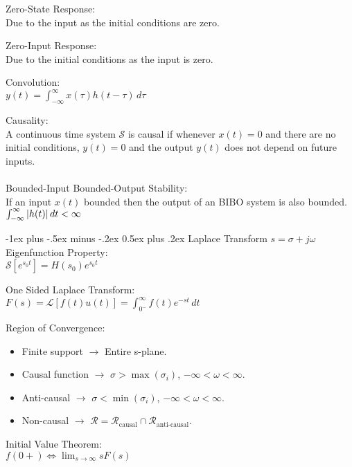 \documentclass[12pt,landscape]{article}
\makeatletter
\renewcommand{\section}{\@startsection{section}{1}{0mm}%
                                {-1ex plus -.5ex minus -.2ex}%
                                {0.5ex plus .2ex}%
                                {\normalfont\normalsize\bfseries}}
\newcommand{\tab}{\hspace{.02\textwidth}}
\newcommand{\ds}{\displaystyle}
\makeatother
\begin{document}
\begin{multicols*}{3}
Zero-State Response:\\
\tab Due to the input as the initial conditions are zero.

Zero-Input Response:\\
\tab Due to the initial conditions as the input is zero.

Convolution:\\
\tab $y(t) = \int_{-\infty}^{\infty}x(\tau)h(t-\tau)\,d\tau$

Causality:\\
\tab A continuous time system $\mathcal{S}$ is causal if whenever $x(t) = 0$ and there are no initial conditions, $y(t) = 0$ and the output $y(t)$ does not depend on future inputs.
\\~\\
Bounded-Input Bounded-Output Stability:\\
\tab If an input $x(t)$ bounded then the output of an BIBO system is also bounded.\\
\tab $\int_{-\infty}^{\infty} \abs{h(t)}\,dt < \infty$

\section{Laplace Transform}
$s = \sigma + j\omega$\\

Eigenfunction Property:\\
\tab $\mathcal{S}[e^{s_0t}] = H(s_0)e^{s_0t}$

One Sided Laplace Transform:\\
\tab $F(s) = \mathcal{L}[f(t)u(t)] = \int_{0^-}^{\infty}f(t)e^{-st}\,dt$

Region of Convergence:
\begin{itemize}
	\itemsep0em
	\item Finite support $\rightarrow$ Entire s-plane.
	\item Causal function $\rightarrow$ $\sigma > \max(\sigma_i)$,  $-\infty < \omega < \infty$.
	\item Anti-causal $\rightarrow$ $\sigma < \min(\sigma_i)$,  $-\infty < \omega < \infty$.
	\item Non-causal $\rightarrow$ $\mathcal{R} = \mathcal{R}_\text{causal} \cap \mathcal{R}_\text{anti-causal}$.
\end{itemize}

Initial Value Theorem:\\
\tab $\ds f(0+) \Leftrightarrow \lim_{s\rightarrow\infty} sF(s)$


\end{multicols*}
\end{document}

